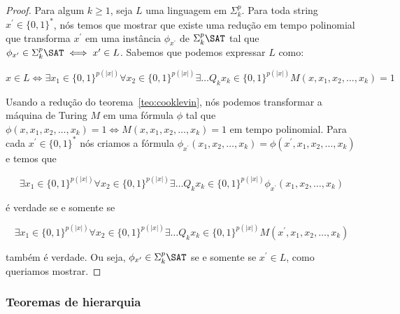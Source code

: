 \begin{proof}

Para algum $k \geq 1$, seja $L$ uma linguagem em $\Sigma_{k}^{p}$. Para toda string $x^{\prime} \in \{0, 1\}^{*}$, nós temos que mostrar que existe uma redução em tempo polinomial que transforma $x^{\prime}$ em uma instância $\phi_{x^{\prime}}$ de $\Sigma_{k}^{p}\SAT$ tal que $\phi_{x^{\prime}} \in \Sigma_{k}^{p}\SAT \iff x^{\prime} \in L$. Sabemos que podemos expressar $L$ como:

\begin{equation*}
    x \in L \iff \exists x_{1} \in \{0, 1\}^{p(\lvert x \rvert)} \forall x_{2} \in \{0, 1\}^{p(\lvert x \rvert)} \exists \dots Q_{k} x_{k} \in \{0, 1\}^{p(\lvert x \rvert)} M(x, x_{1}, x_{2}, \dots, x_{k}) = 1
\end{equation*}

Usando a redução do teorema~\ref{teo:cooklevin}, nós podemos transformar a máquina de Turing $M$ em uma fórmula $\phi$ tal que $\phi(x, x_{1}, x_{2}, \dots, x_{k}) = 1 \iff M(x, x_{1}, x_{2}, \dots, x_{k}) = 1$ em tempo polinomial. Para cada $x^{\prime} \in \{0, 1\}^{*}$ nós criamos a fórmula $\phi_{x^{\prime}}(x_{1}, x_{2}, \dots, x_{k}) = \phi(x^{\prime}, x_{1}, x_{2}, \dots, x_{k})$ e temos que

\begin{equation*}
    \exists x_{1} \in \{0, 1\}^{p(\lvert x \rvert)} \forall x_{2} \in \{0, 1\}^{p(\lvert x \rvert)} \exists \dots Q_{k} x_{k} \in \{0, 1\}^{p(\lvert x \rvert)} \phi_{x^{\prime}}(x_{1}, x_{2}, \dots, x_{k})
\end{equation*}

é verdade se e somente se

\begin{equation*}
     \exists x_{1} \in \{0, 1\}^{p(\lvert x \rvert)} \forall x_{2} \in \{0, 1\}^{p(\lvert x \rvert)} \exists \dots Q_{k} x_{k} \in \{0, 1\}^{p(\lvert x \rvert)} M(x^{\prime}, x_{1}, x_{2}, \dots, x_{k})
\end{equation*}

também é verdade. Ou seja, $\phi_{x^{\prime}} \in \Sigma_{k}^{p}\SAT$ se e somente se $x^{\prime} \in L$, como queriamos mostrar.

\end{proof}

\subsubsection{Teoremas de hierarquia}

